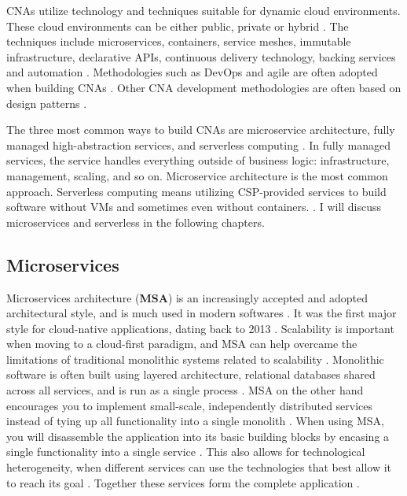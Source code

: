 \documentclass[utf8,english]{gradu3}
\begin{document}
CNAs utilize technology and techniques suitable for dynamic cloud environments.
These cloud environments can be either public, private or hybrid
\parencite{CNAF2018}. The techniques include microservices, containers, service
meshes, immutable infrastructure, declarative APIs, continuous delivery
technology, backing services and automation \parencite{CNAF2018, Patrizio2018,
  Microsoft2022-CNA}. Methodologies such as DevOps and agile are often adopted when
building CNAs \parencite{Patrizio2018}. Other CNA development methodologies are
often based on design patterns \parencite{Kratzke2017}.

The three most common ways to build CNAs are microservice architecture, fully
managed high-abstraction services, and serverless computing
\parencite[17]{Gannon2017}. In fully managed services, the service handles
everything outside of business logic: infrastructure, management, scaling, and
so on. Microservice architecture is the most common approach. Serverless
computing means utilizing CSP-provided services to build software without
VMs and sometimes even without containers.
\parencite[17]{Gannon2017}. I will discuss microservices and serverless in the
following chapters.


\subsection{Microservices}

Microservices architecture (\textbf{MSA}) is an increasingly accepted and
adopted architectural style, and is much used in modern softwares
\parencite[10]{Vale2022}. It was the first major style for cloud-native
applications, dating back to 2013 \parencite[18]{Gannon2017}. Scalability is
important when moving to a cloud-first paradigm, and MSA can help overcame the
limitations of traditional monolithic systems related to scalability
\parencite[10]{Vale2022}. Monolithic software is often built using layered
architecture, relational databases shared across all services, and is run as a
single process \parencite{Microsoft2022-CNA}. MSA on the other hand encourages you
to implement small-scale, independently distributed services instead of tying up
all functionality into a single monolith \parencite[1]{Li2021}. When using MSA,
you will disassemble the application into its basic building blocks by encasing
a single functionality into a single service \parencite[18]{Gannon2017}. This
also allows for technological heterogeneity, when different services can use the
technologies that best allow it to reach its goal \parencite[18]{Li2021}.
Together these services form the complete application \parencite{Microsoft2022-CNA}.
\end{document}
